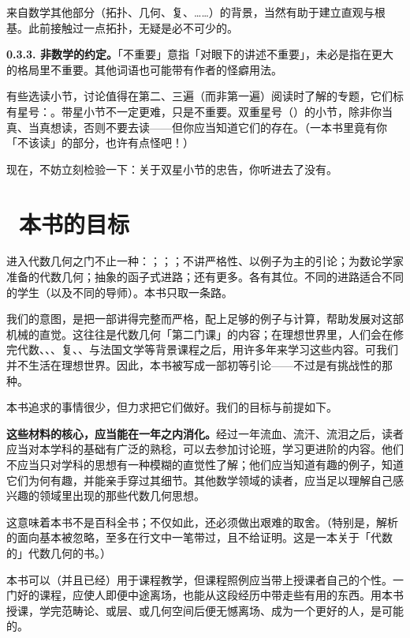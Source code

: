 来自数学其他部分（拓扑、几何、复\trAnalysis、\trNumberTheory{}……）的背景，当然有助于建立直观与根基。此前接触过一点拓扑，无疑是必不可少的。

\noindent\textbf{0.3.3. 非数学的约定。}\quad 「不重要」意指「对眼下的讲述不重要」，未必是指在更大的格局里不重要。其他词语也可能带有作者的怪癖用法。

有些选读小节，讨论值得在第二、三遍（而非第一遍）阅读时了解的专题，它们标有星号：\hard。带星小节不一定更难，只是不重要。双重星号（\extrahard）的小节，除非你当真、当真想读，否则不要去读——但你应当知道它们的存在。（一本书里竟有你「不该读」的部分，也许有点怪吧！）

现在，不妨立刻检验一下：关于双星小节的忠告，你听进去了没有。

\section{\extrahard\ 本书的目标}

进入代数几何之门不止一种：\trRiemannSurface；\trComplexGeometry；\trVarietyTheory{}；不讲严格性、以例子为主的引论；为数论学家准备的代数几何；抽象的函子式进路；还有更多。各有其位。不同的进路适合不同的学生（以及不同的导师）。本书只取一条路。

我们的意图，是把一部\trCanon{}讲得完整而严格，配上足够的例子与计算，帮助发展对这部机械的直觉。这往往是代数几何「第二门课」的内容；在理想世界里，人们会在修完\trCommutative{}代数、\trAlgebraicTopology、\trDifferentialGeometry、复\trAnalysis、\trHomologicalAlgebra、\trNumberTheory{}与法国文学等背景课程之后，用许多年来学习这些内容。可我们并不生活在理想世界。因此，本书被写成一部初等引论——不过是有挑战性的那种。

本书追求的事情很少，但力求把它们做好。我们的目标与前提如下。

\noindent\textbf{这些材料的核心，应当能在一年之内消化。}经过一年流血、流汗、流泪之后，读者应当对本学科的基础有广泛的熟稔，可以去参加讨论班，学习更进阶的内容。他们不应当只对学科的思想有一种模糊的直觉性了解；他们应当知道有趣的例子，知道它们为何有趣，并能亲手穿过其细节。其他数学领域的读者，应当足以理解自己感兴趣的领域里出现的那些代数几何思想。

这意味着本书不是百科全书；不仅如此，还必须做出艰难的取舍。（特别是，解析的面向基本被忽略，至多在行文中一笔带过，且不给证明。这是一本关于「代数的」代数几何的书。）

本书可以（并且已经）用于课程教学，但课程照例应当带上授课者自己的个性。一门好的课程，应使人即便中途离场，也能从这段经历中带走些有用的东西。用本书授课，学完范畴论、或层、或几何空间后便无憾离场、成为一个更好的人，是可能的。

